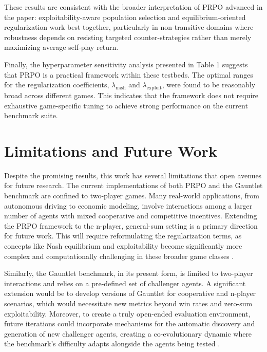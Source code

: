 \documentclass[sigconf,anonymous]{aamas}
\begin{document}
These results are consistent with the broader interpretation of PRPO advanced in the paper: exploitability-aware population selection and equilibrium-oriented regularization work best together, particularly in non-transitive domains where robustness depends on resisting targeted counter-strategies rather than merely maximizing average self-play return.

Finally, the hyperparameter sensitivity analysis presented in Table 1 suggests that PRPO is a practical framework within these testbeds. The optimal ranges for the regularization coefficients, $\lambda_{\text{nash}}$ and $\lambda_{\text{exploit}}$, were found to be reasonably broad across different games. This indicates that the framework does not require exhaustive game-specific tuning to achieve strong performance on the current benchmark suite.

\section{Limitations and Future Work}

Despite the promising results, this work has several limitations that open avenues for future research. The current implementations of both PRPO and the Gauntlet benchmark are confined to two-player games. Many real-world applications, from autonomous driving to economic modeling, involve interactions among a larger number of agents with mixed cooperative and competitive incentives. Extending the PRPO framework to the n-player, general-sum setting is a primary direction for future work. This will require reformulating the regularization terms, as concepts like Nash equilibrium and exploitability become significantly more complex and computationally challenging in these broader game classes \cite{Hu2003}.

Similarly, the Gauntlet benchmark, in its present form, is limited to two-player interactions and relies on a pre-defined set of challenger agents. A significant extension would be to develop versions of Gauntlet for cooperative and n-player scenarios, which would necessitate new metrics beyond win rates and zero-sum exploitability. Moreover, to create a truly open-ended evaluation environment, future iterations could incorporate mechanisms for the automatic discovery and generation of new challenger agents, creating a co-evolutionary dynamic where the benchmark's difficulty adapts alongside the agents being tested \cite{Samvelyan2023}.
\end{document}
